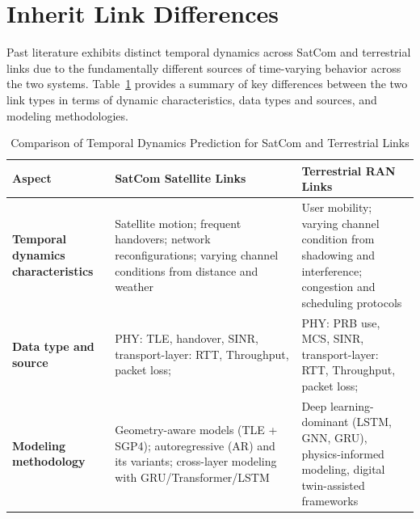 \documentclass[12pt]{article}
\begin{document}
\section{Inherit Link Differences}
\label{sec: arch}


Past literature exhibits distinct temporal dynamics across SatCom and terrestrial links due to the fundamentally different sources of time-varying behavior across the two systems. Table~\ref{tab:leo_vs_ran} provides a summary of key differences between the two link types in terms of dynamic characteristics, data types and sources, and modeling methodologies.

\begin{table}[h]
\centering
\caption{Comparison of Temporal Dynamics Prediction for SatCom and Terrestrial Links}
\label{tab:leo_vs_ran}
\renewcommand{\arraystretch}{0.8}
\begin{tabular}{
>{\raggedright\arraybackslash}p{3cm}
>{\raggedright\arraybackslash}p{6.2cm}
>{\raggedright\arraybackslash}p{6.2cm}
}
\toprule
\textbf{Aspect} & \textbf{SatCom Satellite Links} & \textbf{Terrestrial RAN Links} \\
\midrule

\textbf{Temporal dynamics characteristics} 
& Satellite motion; frequent handovers; network reconfigurations; varying channel conditions from distance and weather  
& User mobility; varying channel condition from shadowing and interference; congestion and scheduling protocols \\\hline

\textbf{Data type and source} 
& PHY: TLE, handover, SINR, transport-layer: RTT, Throughput, packet loss; \newline 
& PHY: PRB use, MCS, SINR, transport-layer: RTT, Throughput, packet loss; \newline \\\hline

\textbf{Modeling methodology} 
& Geometry-aware models (TLE + SGP4); autoregressive (AR) and its variants; cross-layer modeling with GRU/Transformer/LSTM
& Deep learning-dominant (LSTM, GNN, GRU), physics-informed modeling, digital twin-assisted frameworks \\

\bottomrule
\end{tabular}
\end{table}
\end{document}
